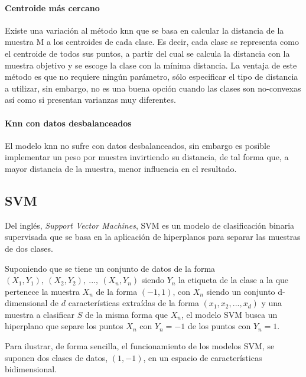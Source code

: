 \paragraph{Centroide más cercano} Existe una variación al método knn que se basa en calcular la distancia de la muestra M a los centroides de cada clase. Es decir, cada clase se representa como el centroide de todos sus puntos, a partir del cual se calcula la distancia con la muestra objetivo y se escoge la clase con la mínima distancia. La ventaja de este método es que no requiere ningún parámetro, sólo especificar el tipo de distancia a utilizar, sin embargo, no es una buena opción cuando las clases son no-convexas así como si presentan varianzas muy diferentes.

\paragraph{Knn con datos desbalanceados} El modelo knn no sufre con datos desbalanceados, sin embargo es posible implementar un peso por muestra invirtiendo su distancia, de tal forma que, a mayor distancia de la muestra,  menor influencia en el resultado.
\subsection{SVM}

Del inglés, \textit{Support Vector Machines}, SVM es un modelo de clasificación binaria supervisada que se basa en la aplicación de hiperplanos para separar las muestras de dos clases.

Suponiendo que se tiene un conjunto de datos de la forma $\left(X_{1},Y_{1}\right),\:\left(X_{2},Y_{2}\right),\:...,\:\left(X_{n},Y_{n}\right)$ siendo $Y_{n}$ la etiqueta de la clase a la que pertenece la muestra $X_{n}$ de la forma $\left(-1,1\right)$, con $X_{n}$ siendo un conjunto d-dimensional de $d$ características extraídas de la forma $\left(x_{1},x_{2},...,x_{d}\right)$ y una muestra a clasificar $S$ de la misma forma que $X_{n}$, el modelo SVM busca un hiperplano que separe los puntos $X_{n}$ con $Y_{n} = -1$ de los puntos con $Y_{n} = 1$.

Para ilustrar, de forma sencilla, el funcionamiento de los modelos SVM, se suponen dos clases de datos, $\left(1,-1\right)$, en un espacio de características bidimensional.

